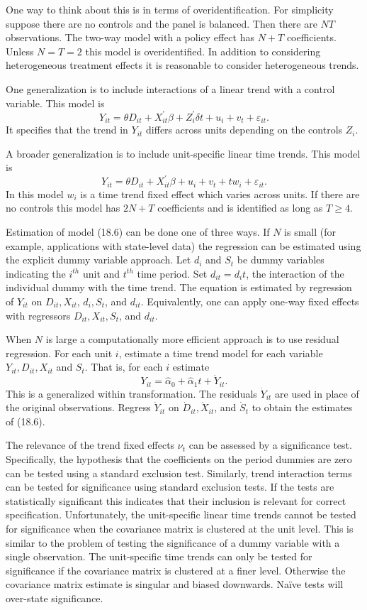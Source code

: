 \documentclass[10pt]{article}
\begin{document}
One way to think about this is in terms of overidentification. For simplicity suppose there are no controls and the panel is balanced. Then there are $N T$ observations. The two-way model with a policy effect has $N+T$ coefficients. Unless $N=T=2$ this model is overidentified. In addition to considering heterogeneous treatment effects it is reasonable to consider heterogeneous trends.

One generalization is to include interactions of a linear trend with a control variable. This model is
$$
Y_{i t}=\theta D_{i t}+X_{i t}^{\prime} \beta+Z_{i}^{\prime} \delta t+u_{i}+v_{t}+\varepsilon_{i t} .
$$
It specifies that the trend in $Y_{i t}$ differs across units depending on the controls $Z_{i}$.

A broader generalization is to include unit-specific linear time trends. This model is
$$
Y_{i t}=\theta D_{i t}+X_{i t}^{\prime} \beta+u_{i}+v_{t}+t w_{i}+\varepsilon_{i t} .
$$
In this model $w_{i}$ is a time trend fixed effect which varies across units. If there are no controls this model has $2 N+T$ coefficients and is identified as long as $T \geq 4$.

Estimation of model (18.6) can be done one of three ways. If $N$ is small (for example, applications with state-level data) the regression can be estimated using the explicit dummy variable approach. Let $d_{i}$ and $S_{t}$ be dummy variables indicating the $i^{t h}$ unit and $t^{t h}$ time period. Set $d_{i t}=d_{i} t$, the interaction of the individual dummy with the time trend. The equation is estimated by regression of $Y_{i t}$ on $D_{i t}, X_{i t}$, $d_{i}, S_{t}$, and $d_{i t}$. Equivalently, one can apply one-way fixed effects with regressors $D_{i t}, X_{i t}, S_{t}$, and $d_{i t}$.

When $N$ is large a computationally more efficient approach is to use residual regression. For each unit $i$, estimate a time trend model for each variable $Y_{i t}, D_{i t}, X_{i t}$ and $S_{t}$. That is, for each $i$ estimate
$$
Y_{i t}=\widehat{\alpha}_{0}+\widehat{\alpha}_{1} t+\dot{Y}_{i t} .
$$
This is a generalized within transformation. The residuals $\dot{Y}_{i t}$ are used in place of the original observations. Regress $\dot{Y}_{i t}$ on $\dot{D}_{i t}, \dot{X}_{i t}$, and $\dot{S}_{t}$ to obtain the estimates of (18.6).

The relevance of the trend fixed effects $\nu_{t}$ can be assessed by a significance test. Specifically, the hypothesis that the coefficients on the period dummies are zero can be tested using a standard exclusion test. Similarly, trend interaction terms can be tested for significance using standard exclusion tests. If the tests are statistically significant this indicates that their inclusion is relevant for correct specification. Unfortunately, the unit-specific linear time trends cannot be tested for significance when the covariance matrix is clustered at the unit level. This is similar to the problem of testing the significance of a dummy variable with a single observation. The unit-specific time trends can only be tested for significance if the covariance matrix is clustered at a finer level. Otherwise the covariance matrix estimate is singular and biased downwards. Naïve tests will over-state significance.
\end{document}
